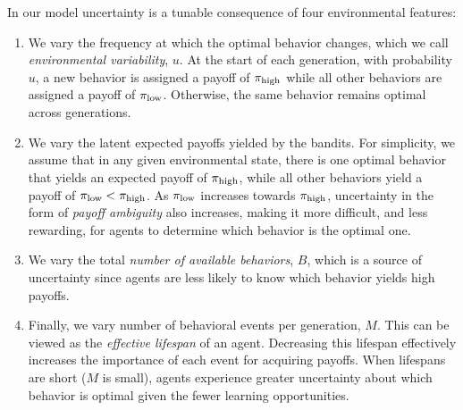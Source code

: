 \documentclass[letterpaper,11.5pt]{scrartcl}
\begin{document}
In our model uncertainty is a tunable consequence of four environmental features:
\begin{enumerate}
    \item 
      We vary the frequency at which the optimal behavior changes, which we call
      \emph{environmental variability}, $u$. At the start of each generation, with
      probability $u$, a new behavior is assigned a payoff of $\pi_{\mathrm{high}}$ while all
      other behaviors are assigned a payoff of $\pi_{\mathrm{low}}$. Otherwise, the same
      behavior remains optimal across generations. 
    \item We vary the latent expected payoffs yielded by the bandits. For simplicity,
      we assume that in any given environmental state, there is one optimal behavior that
      yields an expected payoff of $\pi_{\mathrm{high}}$, while all other behaviors yield a 
      payoff of $\pi_{\mathrm{low}} < \pi_{\mathrm{high}}$. As $\pi_{\mathrm{low}}$ increases towards 
      $\pi_{\mathrm{high}}$, uncertainty in the form of \emph{payoff ambiguity} also increases,
      making it more difficult, and less rewarding, for agents to determine which
      behavior is the optimal one.
    \item We vary the total \emph{number of available behaviors}, $B$, which is a
      source of uncertainty since agents are less likely to know which behavior yields high payoffs.  
    \item Finally, we vary number of behavioral events per generation, $M$. This can be viewed as the \emph{effective lifespan} of an agent.  Decreasing this lifespan effectively increases the importance of each event for acquiring payoffs. When lifespans are short ($M$ is small), agents experience greater uncertainty about which behavior is optimal given the fewer learning opportunities.
\end{enumerate}
\end{document}
